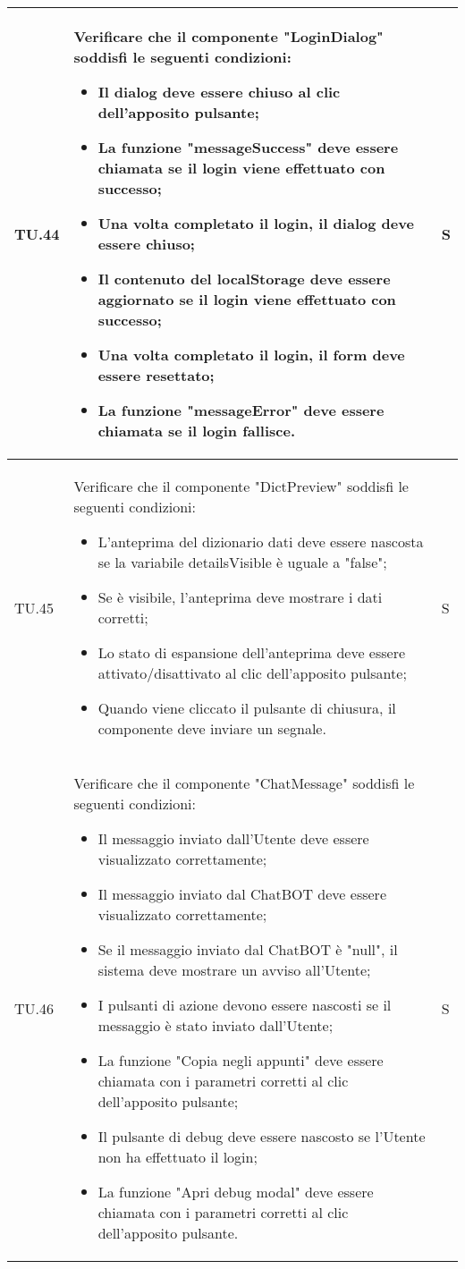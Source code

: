 \begin{adjustwidth}{-0.5cm}{-0.5cm}
\begin{longtable}{|P{1.5cm}|>{\raggedright}P{9.5cm}|>{\arraybackslash}P{1.5cm}|}
		\hline TU.44 & Verificare che il componente "LoginDialog" soddisfi le seguenti condizioni:
    \begin{itemize}
      \item Il dialog deve essere chiuso al clic dell'apposito pulsante;
			\item La funzione "messageSuccess" deve essere chiamata se il login viene effettuato con successo;
			\item Una volta completato il login, il dialog deve essere chiuso;
			\item Il contenuto del localStorage deve essere aggiornato se il login viene effettuato con successo;
			\item Una volta completato il login, il form deve essere resettato;
			\item La funzione "messageError" deve essere chiamata se il login fallisce.
    \end{itemize} & S \\

		\hline TU.45 & Verificare che il componente "DictPreview" soddisfi le seguenti condizioni:
    \begin{itemize}
      \item L'anteprima del dizionario dati deve essere nascosta se la variabile detailsVisible è uguale a "false";
			\item Se è visibile, l'anteprima deve mostrare i dati corretti;
			\item Lo stato di espansione dell'anteprima deve essere attivato/disattivato al clic dell'apposito pulsante;
			\item Quando viene cliccato il pulsante di chiusura, il componente deve inviare un segnale.
    \end{itemize} & S \\

		\hline TU.46 & Verificare che il componente "ChatMessage" soddisfi le seguenti condizioni:
    \begin{itemize}
      \item Il messaggio inviato dall'Utente deve essere visualizzato correttamente;
			\item Il messaggio inviato dal ChatBOT deve essere visualizzato correttamente;
			\item Se il messaggio inviato dal ChatBOT è "null", il sistema deve mostrare un avviso all'Utente;
			\item I pulsanti di azione devono essere nascosti se il messaggio è stato inviato dall'Utente;
			\item La funzione "Copia negli appunti" deve essere chiamata con i parametri corretti al clic dell'apposito pulsante;
			\item Il pulsante di debug deve essere nascosto se l'Utente non ha effettuato il login;
			\item La funzione "Apri debug modal" deve essere chiamata con i parametri corretti al clic dell'apposito pulsante.
    \end{itemize} & S \\


\end{longtable}
\end{adjustwidth}
